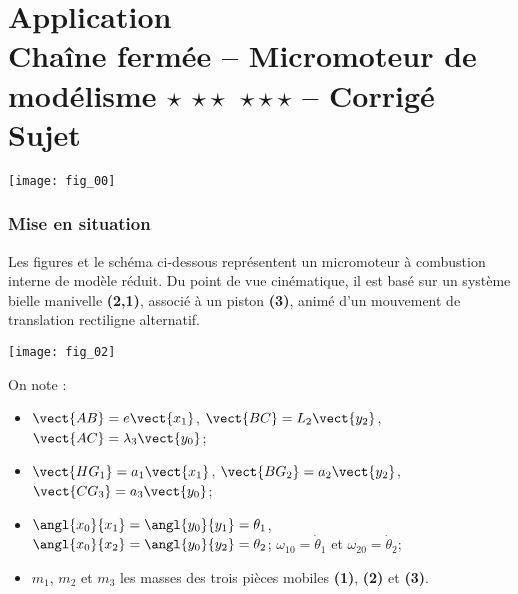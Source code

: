 \chapter*{Application  \\ 
Chaîne fermée -- Micromoteur de modélisme  \ifnormal $\star$ \else \fi \ifdifficile $\star\star$ \else \fi \iftdifficile $\star\star\star$ \else \fi
-- \ifprof Corrigé \else Sujet \fi}

\iflivret {} \else
\ifprof  {} \else \fi
\fi

\setcounter{question}{0}
\begin{marginfigure}
\texttt{[image: fig\_00]}
\end{marginfigure}


\subsection*{Mise en situation}
\ifprof
\else
Les figures et le schéma ci-dessous représentent un micromoteur à combustion interne de modèle réduit. Du point de vue cinématique, il est basé sur un système bielle manivelle \textbf{(2,1)}, associé à un piston \textbf{(3)}, animé d’un mouvement de translation rectiligne alternatif. 

\begin{marginfigure}
\texttt{[image: fig\_02]}
\end{marginfigure}


On note : 
\begin{itemize}
\item $\vect{AB}=e\vect{x_1}$, $\vect{BC}=L_2\vect{y_2}$, $\vect{AC}=\lambda_3\vect{y_0}$;
\item $\vect{HG_1}=a_1\vect{x_1}$, $\vect{BG_2}=a_2\vect{y_2}$, $\vect{CG_3}=a_3\vect{y_0}$;
\item $\angl{x_0}{x_1}=\angl{y_0}{y_1}=\theta_1$, $\angl{x_0}{x_2}=\angl{y_0}{y_2}=\theta_2$; $\omega_{10}=\dot{\theta}_1$ et $\omega_{20}=\dot{\theta}_2$;
\item $m_1$, $m_2$ et $m_3$ les masses des trois pièces mobiles \textbf{(1)}, \textbf{(2)} et \textbf{(3)}.
\end{itemize}

